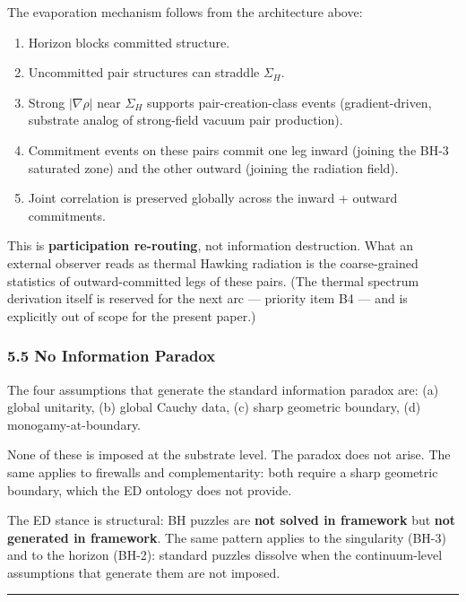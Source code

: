 \documentclass[
  11pt,
  a4paper,
]{article}
\providecommand{\tightlist}{%
  \setlength{\itemsep}{0pt}\setlength{\parskip}{0pt}}
\begin{document}
The evaporation mechanism follows from the architecture above:

\begin{enumerate}
\def\labelenumi{\arabic{enumi}.}
\tightlist
\item
  Horizon blocks committed structure.
\item
  Uncommitted pair structures can straddle \(\Sigma_H\).
\item
  Strong \(|\nabla\rho|\) near \(\Sigma_H\) supports pair-creation-class
  events (gradient-driven, substrate analog of strong-field vacuum pair
  production).
\item
  Commitment events on these pairs commit one leg inward (joining the
  BH-3 saturated zone) and the other outward (joining the radiation
  field).
\item
  Joint correlation is preserved globally across the inward + outward
  commitments.
\end{enumerate}

This is \textbf{participation re-routing}, not information destruction.
What an external observer reads as thermal Hawking radiation is the
coarse-grained statistics of outward-committed legs of these pairs. (The
thermal spectrum derivation itself is reserved for the next arc ---
priority item B4 --- and is explicitly out of scope for the present
paper.)

\subsubsection{5.5 No Information Paradox}\label{no-information-paradox}

The four assumptions that generate the standard information paradox are:
(a) global unitarity, (b) global Cauchy data, (c) sharp geometric
boundary, (d) monogamy-at-boundary.

None of these is imposed at the substrate level. The paradox does not
arise. The same applies to firewalls and complementarity: both require a
sharp geometric boundary, which the ED ontology does not provide.

The ED stance is structural: BH puzzles are \textbf{not solved in
framework} but \textbf{not generated in framework}. The same pattern
applies to the singularity (BH-3) and to the horizon (BH-2): standard
puzzles dissolve when the continuum-level assumptions that generate them
are not imposed.

\begin{center}\rule{0.5\linewidth}{0.5pt}\end{center}
\end{document}
